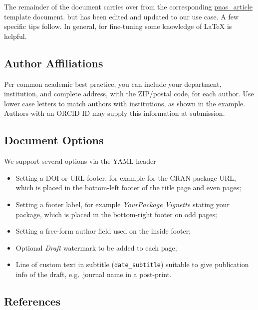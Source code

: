 \documentclass[letterpaper,9pt,twocolumn,twoside,]{pinp}
\providecommand{\tightlist}{%
  \setlength{\itemsep}{0pt}\setlength{\parskip}{0pt}}
\begin{document}
The remainder of the document carries over from the corresponding
\href{https://github.com/rstudio/rticles/tree/master/inst/rmarkdown/templates/pnas_article}{pnas\_article}
template document. but has been edited and updated to our use case. A
few specific tips follow. In general, for fine-tuning some knowledge of
LaTeX is helpful.

\hypertarget{author-affiliations}{%
\subsection{Author Affiliations}\label{author-affiliations}}

Per common academic best practice, you can include your department,
institution, and complete address, with the ZIP/postal code, for each
author. Use lower case letters to match authors with institutions, as
shown in the example. Authors with an ORCID ID may supply this
information at submission.

\hypertarget{document-options}{%
\subsection{Document Options}\label{document-options}}

We support several options via the YAML header

\begin{itemize}
\tightlist
\item
  Setting a DOI or URL footer, for example for the CRAN package URL,
  which is placed in the bottom-left footer of the title page and even
  pages;
\item
  Setting a footer label, for example \emph{YourPackage Vignette}
  stating your package, which is placed in the bottom-right footer on
  odd pages;
\item
  Setting a free-form author field used on the inside footer;
\item
  Optional \emph{Draft} watermark to be added to each page;
\item
  Line of custom text in subtitle (\texttt{date\_subtitle}) suitable to
  give publication info of the draft, e.g.~journal name in a post-print.
\end{itemize}

\hypertarget{references}{%
\subsection{References}\label{references}}
\end{document}
